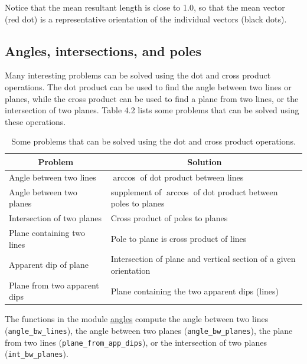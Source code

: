 \documentclass[a4paper , 12pt]{book}
\newcommand{\code}[1]{\colorbox{light-gray}{\texttt{#1}}}
\begin{document}
Notice that the mean resultant length is close to 1.0, so that the mean vector (red dot) is a representative orientation of the individual vectors (black dots).

\subsection{Angles, intersections, and poles}

Many interesting problems can be solved using the dot and cross product operations. The dot product can be used to find the angle between two lines or planes, while the cross product can be used to find a plane from two lines, or the intersection of two planes. Table 4.2 lists some problems that can be solved using these operations.

\begin{table}[H]
\small
\centering
\begin{tabular}{ | p{6cm} | p{6cm} | } 
 \hline
 \multicolumn{1}{|c|}{Problem} & \multicolumn{1}{|c|}{Solution}  \\
 \hline
 Angle between two lines & $\arccos$ of dot product between lines \\
 \hline
 Angle between two planes & supplement of $\arccos$ of dot product between poles to planes \\
 \hline
 Intersection of two planes & Cross product of poles to planes \\
 \hline
 Plane containing two lines & Pole to plane is cross product of lines \\
 \hline
 Apparent dip of plane & Intersection of plane and vertical section of a given orientation \\
 \hline
 Plane from two apparent dips & Plane containing the two apparent dips (lines) \\
 \hline
\end{tabular}
\caption{Some problems that can be solved using the dot and cross product operations.}
\label{table4.2}
\end{table}

The functions in the module \href{https://github.com/nfcd/compGeo/blob/master/source/functions/angles.py}{angles} compute the angle between two lines (\code{angle\_bw\_lines}), the angle between two planes (\code{angle\_bw\_planes}), the plane from two lines (\code{plane\_from\_app\_dips}), or the intersection of two planes (\code{int\_bw\_planes}).
\end{document}
